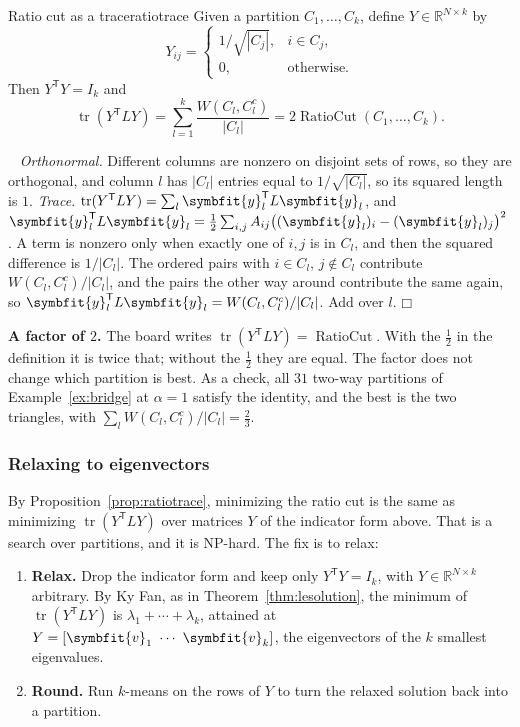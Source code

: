 \documentclass[11pt]{article}
\newcommand{\bm}[1]{\symbfit{#1}}
\newenvironment{proofsketch}{\par\noindent{\itshape Proof.}\ }{\hfill$\mdlgwhtsquare$\par}
\newcommand{\R}{\mathbb{R}}
\newcommand{\T}{^{\mathsf T}}
\newcommand{\tr}{\operatorname{tr}}
\begin{document}
\begin{proposition}{Ratio cut as a trace}{ratiotrace}
Given a partition $C_1,\dots,C_k$, define $Y\in\R^{N\times k}$ by
\[
Y_{ij}=\begin{cases}1/\sqrt{|C_j|}, & i\in C_j,\\ 0, & \text{otherwise.}\end{cases}
\]
Then $Y\T Y=I_k$ and
\[
\tr(Y\T LY)=\sum_{l=1}^k\frac{W(C_l,C_l^c)}{|C_l|}=2\operatorname{RatioCut}(C_1,\dots,C_k).
\]
\end{proposition}
\begin{proofsketch}
\emph{Orthonormal.} Different columns are nonzero on disjoint sets of rows, so they are orthogonal, and column $l$ has $|C_l|$ entries equal to $1/\sqrt{|C_l|}$, so its squared length is $1$.
\emph{Trace.} $\tr(Y\T LY)=\sum_l\bm y_l\T L\bm y_l$, and $\bm y_l\T L\bm y_l=\frac12\sum_{i,j}A_{ij}\big((\bm y_l)_i-(\bm y_l)_j\big)^2$. A term is nonzero only when exactly one of $i,j$ is in $C_l$, and then the squared difference is $1/|C_l|$. The ordered pairs with $i\in C_l$, $j\notin C_l$ contribute $W(C_l,C_l^c)/|C_l|$, and the pairs the other way around contribute the same again, so $\bm y_l\T L\bm y_l=W(C_l,C_l^c)/|C_l|$. Add over $l$.
\end{proofsketch}

\begin{careful}
\textbf{A factor of $2$.} The board writes $\tr(Y\T LY)=\operatorname{RatioCut}$. With the $\frac12$ in the definition it is twice that; without the $\frac12$ they are equal. The factor does not change which partition is best. As a check, all $31$ two-way partitions of Example~\ref{ex:bridge} at $\alpha=1$ satisfy the identity, and the best is the two triangles, with $\sum_lW(C_l,C_l^c)/|C_l|=\frac23$.
\end{careful}

\subsubsection*{Relaxing to eigenvectors}

By Proposition~\ref{prop:ratiotrace}, minimizing the ratio cut is the same as minimizing $\tr(Y\T LY)$ over matrices $Y$ of the indicator form above. That is a search over partitions, and it is NP-hard. The fix is to relax:
\begin{enumerate}[nosep,label=\arabic*)]
\item \textbf{Relax.} Drop the indicator form and keep only $Y\T Y=I_k$, with $Y\in\R^{N\times k}$ arbitrary. By Ky Fan, as in Theorem~\ref{thm:lesolution}, the minimum of $\tr(Y\T LY)$ is $\lambda_1+\cdots+\lambda_k$, attained at $Y=[\bm v_1\ \cdots\ \bm v_k]$, the eigenvectors of the $k$ smallest eigenvalues.
\item \textbf{Round.} Run $k$-means on the rows of $Y$ to turn the relaxed solution back into a partition.
\end{enumerate}
\end{document}
